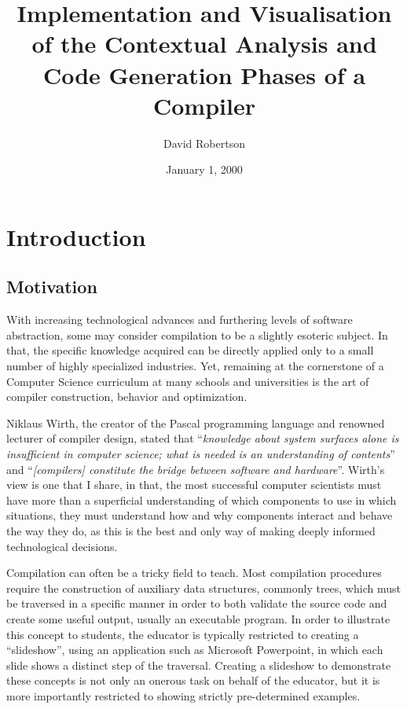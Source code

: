 \documentclass{l4proj}
\begin{document}
\title{Implementation and Visualisation of the Contextual Analysis and Code Generation Phases of a Compiler}
\author{David Robertson}
\date{January 1, 2000}
\maketitle

\begin{abstract}

\end{abstract}

\educationalconsent
%
%
\tableofcontents

\chapter{Introduction}
\section{Motivation}
With increasing technological advances and furthering levels of software abstraction, some may consider compilation to be a slightly esoteric subject. In that, the specific knowledge acquired can be directly applied only to a small number of highly specialized industries. Yet, remaining at the cornerstone of a Computer Science curriculum at many schools and universities is the art of compiler construction, behavior and optimization.

Niklaus Wirth, the creator of the Pascal programming language and renowned lecturer of compiler design, stated that ``\textit{knowledge about system surfaces alone is insufficient in computer science; what is needed is an understanding of contents}'' and ``\textit{[compilers] constitute the bridge between software and hardware}''. Wirth's view is one that I share, in that, the most successful computer scientists must have more than a superficial understanding of which components to use in which situations, they must understand how and why components interact and behave the way they do, as this is the best and only way of making deeply informed technological decisions.

Compilation can often be a tricky field to teach. Most compilation procedures require the construction of auxiliary data structures, commonly trees, which must be traversed in a specific manner in order to both validate the source code and create some useful output, usually an executable program. In order to illustrate this concept to students, the educator is typically restricted to creating a ``slideshow'', using an application such as Microsoft Powerpoint, in which each slide shows a distinct step of the traversal. Creating a slideshow to demonstrate these concepts is not only an onerous task on behalf of the educator, but it is more importantly restricted to showing strictly pre-determined examples. 
\end{document}
